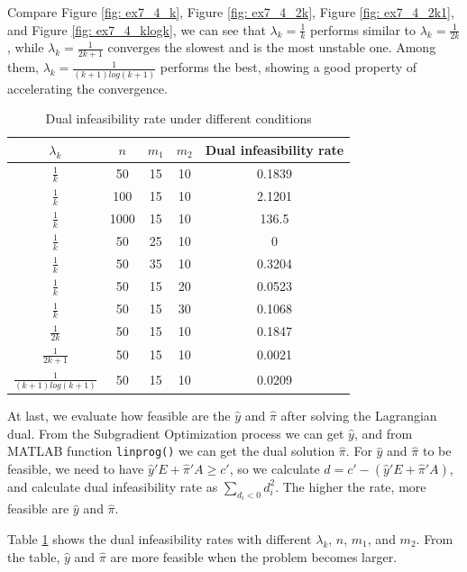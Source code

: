 Compare Figure \ref{fig: ex7_4_k}, Figure \ref{fig: ex7_4_2k}, Figure \ref{fig: ex7_4_2k1}, and Figure \ref{fig: ex7_4_klogk}, we can see that $\lambda_k=\frac{1}{k}$ performs similar to $\lambda_k=\frac{1}{2k}$,  while $\lambda_k=\frac{1}{2k+1}$ converges the slowest and is the most unstable one. Among them, $\lambda_k=\frac{1}{(k+1)log(k+1)}$ performs the best, showing a good property of accelerating the convergence.

\begin{table}[!ht]
\centering
\begin{tabular}{|c|c|c|c|c|}
\hline
$\lambda_k$ & $n$ & $m_1$  & $m_2$ & Dual infeasibility rate \\
\hline
$\frac{1}{k}$  & 50 & 15  & 10 & 0.1839 \\
\hline
$\frac{1}{k}$  & 100 & 15  & 10 & 2.1201 \\
\hline
$\frac{1}{k}$  & 1000 & 15  & 10 & 136.5 \\
\hline
$\frac{1}{k}$  & 50 & 25  & 10 & 0 \\
\hline
$\frac{1}{k}$  & 50 & 35  & 10 & 0.3204 \\
\hline
$\frac{1}{k}$  & 50 & 15  & 20 & 0.0523 \\
\hline
$\frac{1}{k}$  & 50 & 15  & 30 & 0.1068 \\
\hline
$\frac{1}{2k}$  & 50 & 15  & 10 & 0.1847 \\
\hline
$\frac{1}{2k+1}$  & 50 & 15  & 10 & 0.0021 \\
\hline
$\frac{1}{(k+1)log(k+1)}$  & 50 & 15  & 10 & 0.0209 \\
\hline
\end{tabular}
\caption{Dual infeasibility rate under different conditions}
\label{tab: dual_feasible}
\end{table}

At last, we evaluate how feasible are the $\widehat{y}$ and $\widehat{\pi}$ after solving the Lagrangian dual. From the Subgradient Optimization process we can get $\widehat{y}$, and from MATLAB function \texttt{linprog()} we can get the dual solution $\widehat{\pi}$. For  $\widehat{y}$ and $\widehat{\pi}$ to be feasible, we need to have $\widehat{y}'E+\widehat{\pi}'A \geq c'$, so we calculate $d=c'- (\widehat{y}'E+\widehat{\pi}'A)$, and calculate dual infeasibility rate as $\sum_{d_i < 0} d_i^2 $. The higher the rate, more feasible are $\widehat{y}$ and $\widehat{\pi}$. 

Table \ref{tab: dual_feasible} shows the dual infeasibility rates with different $\lambda_k$, $n$, $m_1$, and $m_2$. From the table, $\widehat{y}$ and $\widehat{\pi}$ are more feasible when the problem becomes larger.